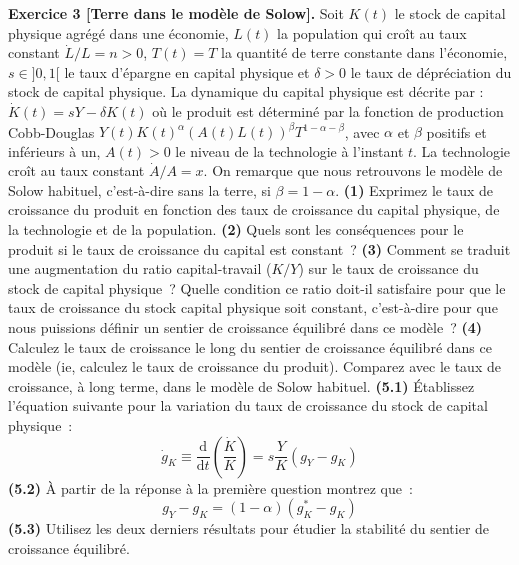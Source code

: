\documentclass[12pt,a4paper,notitlepage,twocolumn]{article}
\begin{document}
\noindent \textbf{Exercice 3 [Terre dans le modèle de Solow].} Soit
$K(t)$ le stock de capital physique agrégé dans une économie, $L(t)$
la population qui croît au taux constant $\dot{L}/L=n>0$, $T(t)=T$
la quantité de terre constante dans l'économie, $s \in ]0,1[$ le
taux d'épargne en capital physique et $\delta>0$ le taux de
dépréciation du stock de capital physique. La dynamique du capital
physique est décrite par : $\dot{K}(t)=sY-\delta K(t)$ où le produit
est déterminé par la fonction de production Cobb-Douglas $
Y(t)K(t)^{\alpha}\left(A(t)L(t)\right)^{\beta}T^{1-\alpha-\beta}$,
avec $\alpha$ et $\beta$ positifs et inférieurs à un, $A(t)>0$ le
niveau de la technologie à l'instant $t$. La technologie croît au
taux constant $\dot{A}/A = x$. On remarque que nous retrouvons le
modèle de Solow habituel, c'est-à-dire sans la terre, si
$\beta=1-\alpha$. \textbf{(1)} Exprimez le taux de croissance du
produit en fonction des taux de croissance du capital physique, de
la technologie et de la population. \textbf{(2)} Quels sont les
conséquences pour le produit si le taux de croissance du capital est
constant~? \textbf{(3)} Comment se traduit une augmentation du ratio
capital-travail ($K/Y$) sur le taux de croissance du stock de
capital physique~? Quelle condition ce ratio doit-il satisfaire pour
que le taux de croissance du stock capital physique soit constant,
c'est-à-dire pour que nous puissions définir un sentier de
croissance équilibré dans ce modèle~? \textbf{(4)} Calculez le taux
de croissance le long du sentier de croissance équilibré dans ce
modèle (ie, calculez le taux de croissance du produit). Comparez
avec le taux de croissance, à long terme, dans le modèle de Solow
habituel. \textbf{(5.1)} \'Etablissez l'équation suivante pour la
variation du taux de croissance du stock de capital physique~:
\[
\dot{g}_K \equiv \frac{\mathrm d}{\mathrm dt}\left(
\frac{\dot{K}}{K}\right) = s\frac{Y}{K}\left(g_Y-g_K\right)
\]
\textbf{(5.2)} \`A partir de la réponse à la première question
montrez que~:
\[
g_Y-g_K = (1-\alpha)\left(g_K^*-g_K\right)
\]
\textbf{(5.3)} Utilisez les deux derniers résultats pour étudier la
stabilité du sentier de croissance équilibré.
\end{document}
